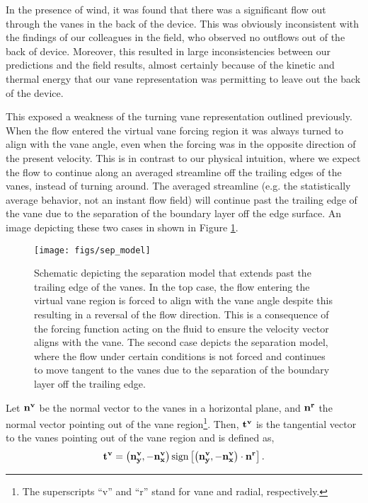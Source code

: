 In the presence of wind, it was found that there was a significant flow
out through the vanes in the back of the device. This was obviously
inconsistent with the findings of our colleagues in the field, who
observed no outflows out of the back of device. Moreover, this resulted
in large inconsistencies between our predictions and the field results,
almost certainly because of the kinetic and thermal energy that our vane
representation was permitting to leave out the back of the device.  

This exposed a weakness of the turning vane representation outlined
previously. When the flow entered the virtual vane forcing region it was
always turned to align with the vane angle, even when the forcing was in
the opposite direction of the present velocity.
This is in contrast to our physical intuition, where we
expect the flow to continue along an averaged streamline
off the trailing edges of the vanes, instead of turning around. 
The averaged streamline (e.g. the statistically average behavior, not
an instant flow field) will continue past the trailing edge of the vane
due to the separation of the boundary layer off the edge surface. An
image depicting these two cases in shown in Figure \ref{fig:sep_model}.  

\begin{figure}[!htb]
  \begin{center}
    \texttt{[image: figs/sep\_model]}
    \caption{Schematic depicting the separation model that extends past
   the trailing edge of the vanes. In the top case, the flow entering
   the virtual vane region is forced to align with the vane angle despite
   this resulting in a reversal of the flow direction. This is a
   consequence of the forcing function acting on the fluid to ensure the
   velocity vector aligns with the vane. 
   The second case depicts the separation
   model, where the flow under certain conditions is not forced and
   continues to move tangent to the vanes due to 
   the separation of the boundary layer off the trailing edge.} 
    \label{fig:sep_model}
  \end{center}
\end{figure}

Let $\bf n^v$ be the normal vector to the vanes in a horizontal plane,
and $\bf n^r$ the normal vector pointing out of the vane
region\footnote{\normalsize The superscripts ``v'' and ``r'' stand for
vane and radial, respectively.}.  
Then, $\bf t^v$ is the tangential vector to the vanes pointing out of
the vane region and is defined as,
\begin{equation}
 \bf t^v = \left( {\bf n^v_y},{\bf -n_x^v} \right) \text{sign}\left[
	    \left( {\bf n^v_y},{\bf -n_x^v} \right) \cdot {\bf n^r} \right].
\end{equation}


